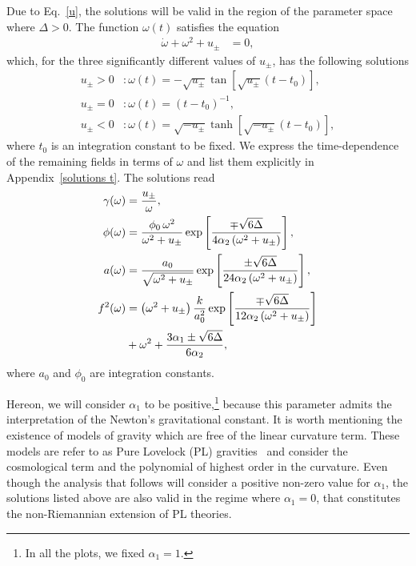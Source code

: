 \documentclass[aps,prd,12pt,superscriptaddress,showpacs,showkeys,longbibliography,reprint,nofootinbib]{revtex4-1}
\begin{document}
Due to Eq.~\eqref{u}, the solutions will be valid in the region of the parameter space where $\Delta>0$. The function $\omega(t)$ satisfies the equation
\begin{align}
  \dot{\omega}+\omega^2+u_{\pm} &= 0,
\end{align}
which, for the three significantly different values of $u_\pm$, has the following solutions
\begin{align}
  u_\pm>0&:\omega(t)=-\sqrt{u_\pm}\tan\left[\sqrt{u_\pm}\left(t-t_0\right)\right],\\
  u_\pm=0&:\omega(t)=\left(t-t_0\right)^{-1},\\
  u_\pm<0&:\omega(t)=\sqrt{-u_\pm}\tanh\left[\sqrt{-u_\pm}\left(t-t_0\right)\right],
\end{align}
where $t_0$ is an integration constant to be fixed. We express the time-dependence of the remaining fields in terms of $\omega$ and list them explicitly in Appendix~\ref{solutions t}. The solutions read
\begin{align}
  \gamma(\omega)&=\frac{u_\pm}{\omega},\\
  \phi(\omega)&=\frac{\phi_0\,\omega^2}{\omega^2+u_\pm}\exp\left[\frac{\mp\sqrt{6\Delta}}{4\alpha_2\left(\omega^2+u_\pm\right)}\right],\\
  a(\omega)&=\frac{a_0}{\sqrt{\omega^2+u_\pm}}\exp\left[\frac{\pm\sqrt{6\Delta}} {24\alpha_2\left(\omega^2+u_\pm\right)}\right],\\
  f^2(\omega)&=\left(\omega^2+u_\pm\right)\frac{k}{a_0^2}\exp\left[\frac{\mp\sqrt{6\Delta}}{12\alpha_2\left(\omega^2+u_\pm\right)}\right]\notag\\
  &+\omega^2  + \frac{3\alpha_1\pm\sqrt{6\Delta}}{6\alpha_2},
\end{align}
where $a_0$ and $\phi_0$ are integration constants.

Hereon, we will consider $\alpha_1$ to be positive,\footnote{In all the plots, we fixed $\alpha_1 = 1$.} because this parameter admits the interpretation of the Newton's gravitational constant. It is worth mentioning the existence of models of gravity which are free of the linear curvature term. These models are refer to as Pure Lovelock (PL) gravities~\cite{Cai:2006pq} and consider the cosmological term and the polynomial of highest order in the curvature. Even though the analysis that follows will consider a positive non-zero value for $\alpha_1$, the solutions listed above are also valid in the regime where $\alpha_1=0$, that constitutes the non-Riemannian extension of PL theories.
\end{document}
